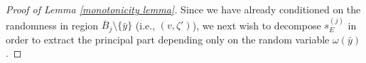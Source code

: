 \documentclass[11pt,reqno,UTF8,twoside]{amsart}
\newcommand{\mcE}{\mathcal{E}}
\newcommand{\barB}{\overline{B}}
\newcommand{\wtSjdeterministic}{\widetilde{S}^{(j),\text{de}}}
\newcommand{\smallSj}{s^{(j)}}
\newcommand{\smallSjminusone}{s^{(j-1)}}
\theoremstyle{definition}
\numberwithin{equation}{section}
\begin{document}
\begin{proof}[Proof of Lemma \ref{monotonicity lemma}]
Since we have already conditioned on the randomness in region $\barB_{j}\setminus\{\bar{y}\}$ (i.e.,  $(v,\zeta')$), we next wish to decompose $\smallSj_E$ in order to extract the principal part depending  only  on the random variable $\omega(\bar{y})$.


\end{proof}
\end{document}
